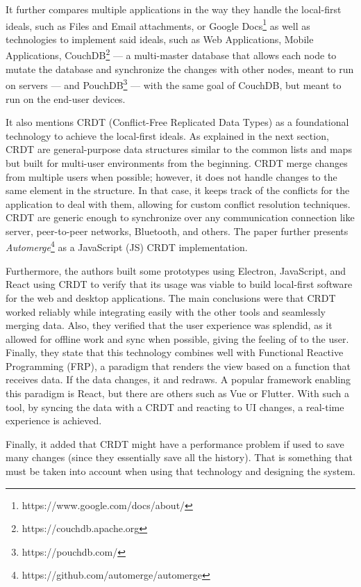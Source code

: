 It further compares multiple applications in the way they handle the local-first ideals, such as Files and Email attachments, or Google Docs\footnote{https://www.google.com/docs/about/} as well as technologies to implement said ideals, such as Web Applications, Mobile Applications, CouchDB\footnote{https://couchdb.apache.org} --- a multi-master database that allows each node to mutate the database and synchronize the changes with other nodes, meant to run on servers --- and PouchDB\footnote{https://pouchdb.com/} --- with the same goal of CouchDB, but meant to run on the end-user devices.

It also mentions CRDT (Conflict-Free Replicated Data Types) as a foundational technology to achieve the local-first ideals. As explained in the next section,  CRDT are general-purpose data structures similar to the common lists and maps but built for multi-user environments from the beginning. CRDT merge changes from multiple users when possible; however, it does not handle changes to the same element in the structure. In that case, it keeps track of the conflicts for the application to deal with them, allowing for custom conflict resolution techniques. CRDT are generic enough to synchronize over any communication connection like server, peer-to-peer networks, Bluetooth, and others. The paper further presents \textit{Automerge}\footnote{https://github.com/automerge/automerge} as a JavaScript (JS) CRDT implementation.

Furthermore, the authors built some prototypes using Electron, JavaScript, and React using CRDT to verify that its usage was viable to build local-first software for the web and desktop applications. The main conclusions were that CRDT worked reliably while integrating easily with the other tools and seamlessly merging data. Also, they verified that the user experience was splendid, as it allowed for offline work and sync when possible, giving the feeling of  to the user. Finally, they state that this technology combines well with Functional Reactive Programming (FRP), a paradigm that renders the view based on a function that receives data. If the data changes, it  and redraws. A popular framework enabling this paradigm is React, but there are others such as Vue or Flutter. With such a tool, by syncing the data with a CRDT and reacting to UI changes, a real-time experience is achieved.

Finally, it added that CRDT might have a performance problem if used to save many changes (since they essentially save all the history). That is something that must be taken into account when using that technology and designing the system.

